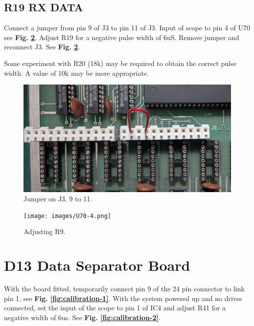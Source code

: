 \subsection{R19 RX DATA}

Connect a jumper from pin 9 of J3 to pin 11 of J3. Input of scope to pin 4 of U70 see \textbf{Fig. \ref{fig:R19}}. Adjust R19 for a negative pulse width of 6uS. Remove jumper and reconnect J3. See \textbf{Fig. \ref{fig:R19}}.

Some experiment with R20 (18k) may be required to obtain the correct pulse width. A value of 10k may be more appropriate.

\begin{figure}[htbp]
\begin{center}
\includegraphics[width=4.9in]{images/9-11.jpg}
\caption{Jumper on J3, 9 to 11.}
\label{fig:jumper2}
\end{center}
\end{figure}

\begin{figure}[htbp]
\begin{center}
\texttt{[image: images/U70-4.png]}
\caption{Adjusting R9.}
\label{fig:R19}
\end{center}
\end{figure}



\section{D13 Data Separator Board}

With the board fitted, temporarily connect pin 9 of the 24 pin connector to link pin 1, see \textbf{Fig. \ref{fig:calibration-1}}. With the system powered up and no drives connected, set the input of the scope to pin 1 of IC4 and adjust R41 for a negative width of 6us. See \textbf{Fig. \ref{fig:calibration-2}}.

